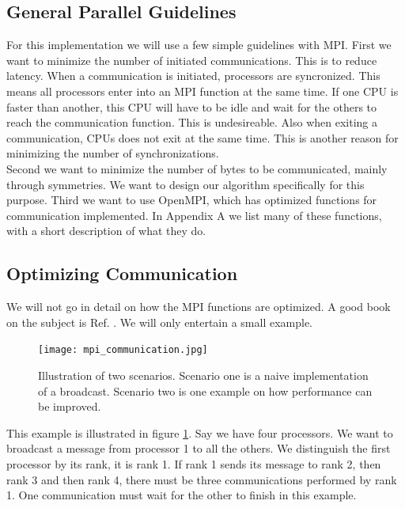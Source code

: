 \documentclass[a4paper,norsk,11pt,twoside]{report}
\begin{document}
\subsection{General Parallel Guidelines}
For this implementation we will use a few simple guidelines with MPI. First we want to minimize the number of initiated communications. This is to reduce latency. When a communication is initiated, processors are syncronized. This means all processors enter into an MPI function at the same time. If one CPU is faster than another, this CPU will have to be idle and wait for the others to reach the communication function. This is undesireable. Also when exiting a communication, CPUs does not exit at the same time. This is another reason for minimizing the number of synchronizations. \\

Second we want to minimize the number of bytes to be communicated, mainly through symmetries. We want to design our algorithm specifically for this purpose. Third we want to use OpenMPI, which has optimized functions for communication implemented. In Appendix A we list many of these functions, with a short description of what they do.

\subsection{Optimizing Communication}

We will not go in detail on how the MPI functions are optimized. A good book on the subject is Ref. \cite{mpi_boka_cite_referanse}. We will only entertain a small example. \\

\begin{figure}[ht!]
\centering
\texttt{[image: mpi\_communication.jpg]}
\caption{Illustration of two scenarios. Scenario one is a naive implementation of a broadcast. Scenario two is one example on how performance can be improved.}
\label{mpi_communication_illustration_thingy}
\end{figure}

This example is illustrated in figure \ref{mpi_communication_illustration_thingy}. Say we have four processors. We want to broadcast a message from processor 1 to all the others. We distinguish the first processor by its rank, it is rank 1. If rank 1 sends its message to rank 2, then rank 3 and then rank 4, there must be three communications performed by rank 1. One communication must wait for the other to finish in this example. \\
\end{document}
